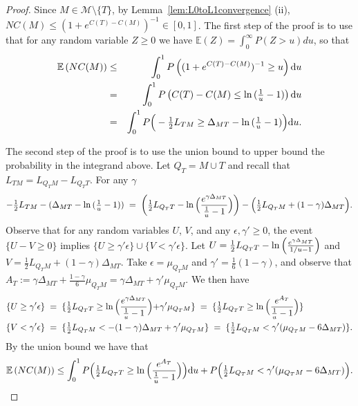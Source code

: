 \documentclass[
  12pt]{article}
\newcommand{\E}{\mathbb{E}}
\begin{document}
\begin{proof}
Since $M\in \mathcal M\setminus \{T\}$, by Lemma~\ref{lem:L0toL1convergence} (ii),  $NC(M)\leq (1+e^{C(T)-C(M)})^{-1} \in [0,1]$.  
The first step of the proof is to use that for any random variable $Z \geq 0$ we have $\E(Z)=\int_0^\infty P(Z>u) du$, so that  %
\begin{eqnarray*}
  \E\left(NC(M)\right)  &\leq& \int_0^1 P\left((1+e^{C(T)-C(M)})^{-1}\geq u\right){\rm d} u\\
  &=&\int_0^1 P\left(C(T)-C(M) \leq \ln{(\tfrac1u-1)}\right){\rm d}u\\
  &=&\int_0^1 P\Big(-\tfrac12 L_{TM} \geq \Delta_{MT}-\ln{(\tfrac1u-1)}\Big) {\rm d}u.
\end{eqnarray*}

The second step of the proof is to use the union bound to upper bound the probability in the integrand above.
Let $Q_T=M \cup T$ and recall that $L_{TM}=L_{Q_TM}-L_{Q_TT}$. For any $\gamma$ 
$$
-\tfrac12 L_{TM} -(\Delta_{MT}-\ln{(\tfrac1u-1)})\;=\;\left(\tfrac12 L_{Q_TT}-\ln{\Bigl(\frac{e^{\gamma\Delta_{MT}}}{\tfrac1u-1}\Bigl)}\right)-\Bigl(\tfrac12 L_{Q_TM}+(1-\gamma)\Delta_{MT}\Bigl).
$$
Observe that for any random variables $U$, $V$, and any $\epsilon,\gamma' \geq 0$, the event $
\{U-V \geq 0\}$ implies $\{U \geq \gamma' \epsilon\}\cup
\{V  < \gamma' \epsilon\}$. Let $U=\tfrac12 L_{Q_TT}-\ln{\Bigl(\frac{e^{\gamma\Delta_{MT}}}{1/u-1}\Bigl)}$ and $V=\tfrac12 L_{Q_TM}+(1-\gamma)\Delta_{MT}$. Take $\epsilon=\mu_{Q_TM}$ and $\gamma'=\tfrac16({1-\gamma})$, and observe that
$A_T:=\gamma\Delta_{MT}+\tfrac{1-\gamma}{6}\mu_{Q_TM}= \gamma\Delta_{MT}+\gamma'\mu_{Q_TM}$. We then have
\begin{align*}
\{U\geq \gamma'\epsilon\}\;&=\;\{\tfrac12 L_{Q_TT}\geq \ln{\Bigl(\frac{e^{\gamma\Delta_{MT}}}{\tfrac1u-1}}\Bigl)+\gamma'\mu_{Q_TM}\}\;=\;\{\tfrac12 L_{Q_TT}\geq \ln{\Bigl(\frac{e^{A_T}}{\tfrac1u-1}}\Bigl)\}\\
\{V<\gamma'\epsilon\}\;&=\;\{\tfrac12 L_{Q_TM}<-(1-\gamma)\Delta_{MT}+\gamma'\mu_{Q_TM}\}\;=\;\{\tfrac12 L_{Q_TM}<\gamma'(\mu_{Q_TM}-6\Delta_{MT})\}.
\end{align*}
By the union bound we have that
\begin{equation}\label{eq:prooflemmas20nonspu}
    \E\left(NC(M)\right)  \leq \int_0^1P\Bigl(\tfrac12 L_{Q_TT}\geq \ln{\Bigl(\frac{e^{A_T}}{\tfrac1u-1}\Bigl)}\Bigl){\rm d}u+ P\Bigl(\tfrac12 L_{Q_TM}<\gamma'(\mu_{Q_TM}-6\Delta_{MT})\Bigl).
\end{equation}


\end{proof}
\end{document}
